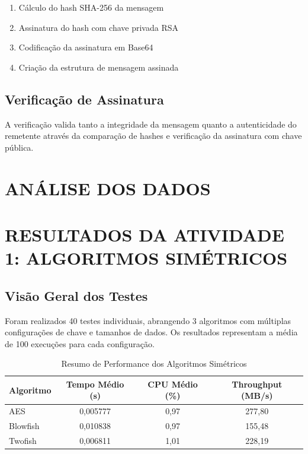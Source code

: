 \documentclass[12pt,a4paper,oneside]{article}
\begin{document}
\begin{enumerate}
    \item Cálculo do hash SHA-256 da mensagem
    \item Assinatura do hash com chave privada RSA
    \item Codificação da assinatura em Base64
    \item Criação da estrutura de mensagem assinada
\end{enumerate}

\subsection{Verificação de Assinatura}

A verificação valida tanto a integridade da mensagem quanto a autenticidade do remetente através da comparação de hashes e verificação da assinatura com chave pública.

\section{ANÁLISE DOS DADOS}

\section{RESULTADOS DA ATIVIDADE 1: ALGORITMOS SIMÉTRICOS}

\subsection{Visão Geral dos Testes}

Foram realizados 40 testes individuais, abrangendo 3 algoritmos com múltiplas configurações de chave e tamanhos de dados. Os resultados representam a média de 100 execuções para cada configuração.

\begin{table}[H]
\centering
\caption{Resumo de Performance dos Algoritmos Simétricos}
\label{tab:performance}
\begin{tabular}{lccc}
\toprule
\textbf{Algoritmo} & \textbf{Tempo Médio (s)} & \textbf{CPU Médio (\%)} & \textbf{Throughput (MB/s)} \\
\midrule
AES & 0,005777 & 0,97 & 277,80 \\
Blowfish & 0,010838 & 0,97 & 155,48 \\
Twofish & 0,006811 & 1,01 & 228,19 \\
\bottomrule
\end{tabular}
\end{table}
\end{document}
